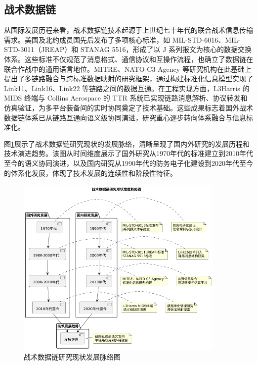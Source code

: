 \subsection{战术数据链}

从国际发展历程来看，战术数据链技术起源于上世纪七十年代的联合战术信息传输需求。美国及北约成员国先后发布了多项核心标准，如 MIL-STD-6016、MIL-STD-3011（JREAP）和 STANAG 5516\cite{丁丁2019,马建强2020}，形成了以 J 系列报文为核心的数据交换体系。这些标准不仅规范了消息格式、通信协议和互操作流程，也确立了数据链在联合作战中的通用语言地位。MITRE、NATO C3 Agency 等研究机构在此基础上提出了多链路融合与跨标准数据映射的研究框架\cite{程方昊2025,陈利玲2025}，通过构建标准化信息模型实现了 Link11、Link16、Link22 等链路之间的数据互通。在工程实现方面，L3Harris 的 MIDS 终端与 Collins Aerospace 的 TTR 系统已实现链路消息解析、协议转发和仿真验证，为多平台装备间的实时协同奠定了技术基础。这些成果标志着国外战术数据链体系已从链路互通向语义级协同演进，研究重心逐步转向体系融合与信息标准化。

图\ref{fig_tactical_datalink_research_status}展示了战术数据链研究现状的发展脉络，清晰呈现了国内外研究的发展历程和技术演进趋势。该图从时间维度展示了国外研究从1970年代的标准建立到2010年代至今的语义协同演进，以及国内研究从1990年代的防务电子化建设到2020年代至今的体系化发展，体现了技术发展的连续性和阶段性特征。

\begin{figure}[H]
    \centering
    \includegraphics[width=0.9\textwidth,height=0.6\textheight,keepaspectratio]{chapters/fig-0/tactical_datalink_research_status.png}
    \caption{战术数据链研究现状发展脉络图}
    \label{fig_tactical_datalink_research_status}
\end{figure}

